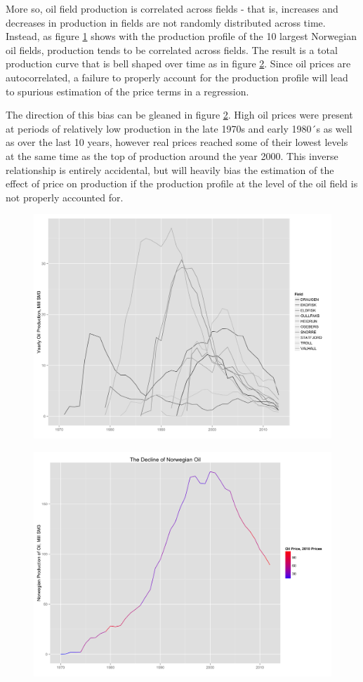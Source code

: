 \documentclass[12pt]{scrartcl} %
\begin{document}
More so, oil field production is correlated across fields - that is, increases and decreases in production in fields are not randomly distributed across time.  Instead, as figure \ref{top10_production} shows with the production profile of the 10 largest Norwegian oil fields, production tends to be correlated across fields.  The result is a total production curve that is bell shaped over time as in figure \ref{oil_decline}.  Since oil prices are autocorrelated, a failure to properly account for the production profile will lead to spurious estimation of the price terms in a regression.  

The direction of this bias can be gleaned in figure \ref{oil_decline}.  High oil prices were present at periods of relatively low production in the late 1970s and early 1980´s as well as over the last 10 years, however real prices reached some of their lowest levels at the same time as the top of production around the year 2000.  This inverse relationship is entirely accidental, but will heavily bias the estimation of the effect of price on production if the production profile at the level of the oil field is not properly accounted for.  

\begin{figure}
	\includegraphics[width=.8\textwidth]{top10_production.png}
	\caption{}
	\label{top10_production}	
	\end{figure}

\begin{figure}
	\includegraphics[width=.8\textwidth]{oil_decline.png}
	\caption{}
	\label{oil_decline}
\end{figure}
\end{document}
